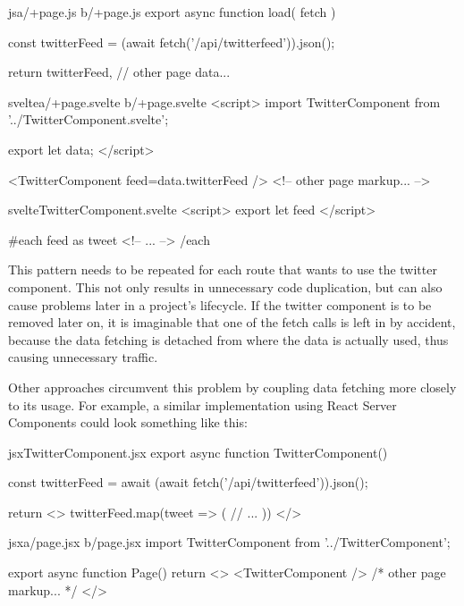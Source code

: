 \begin{listing}[h!]
\begin{myminted}{js}{a/+page.js b/+page.js}
export async function load({ fetch }) {

    const twitterFeed = (await fetch('/api/twitterfeed')).json();

    return {
        twitterFeed,
        // other page data...
    }
}

\end{myminted}
\begin{myminted}{svelte}{a/+page.svelte b/+page.svelte}
<script>
    import TwitterComponent from '../TwitterComponent.svelte';

    export let data;
</script>

<TwitterComponent feed={data.twitterFeed} />
<!-- other page markup... -->
\end{myminted}
\begin{myminted}{svelte}{TwitterComponent.svelte}
<script>
    export let feed
</script>

{#each feed as tweet}
    <!-- ... -->
{/each}
\end{myminted}
\caption{Example Implementation of a reusable component in SvelteKit}
\label{fig:evaluation-reusable-sveltekit}
\end{listing}

This pattern needs to be repeated for each route that wants to use the twitter component. This not only results in unnecessary code duplication, but can also cause problems later in a project's lifecycle. If the twitter component is to be removed later on, it is imaginable that one of the fetch calls is left in by accident, because the data fetching is detached from where the data is actually used, thus causing unnecessary traffic.

Other approaches circumvent this problem by coupling data fetching more closely to its usage. For example, a similar implementation using React Server Components could look something like this:

\begin{listing}[h!]
\begin{myminted}{jsx}{TwitterComponent.jsx}
export async function TwitterComponent() {
    const twitterFeed = await (await fetch('/api/twitterfeed')).json();

    return <>
        {twitterFeed.map(tweet => (
            // ...
        ))}
    </>
}
\end{myminted}
\begin{myminted}{jsx}{a/page.jsx b/page.jsx}
import TwitterComponent from '../TwitterComponent';

export async function Page() {
    return <>
        <TwitterComponent />
        { /* other page markup... */ }
    </>
}
\end{myminted}
\caption{Example of a reusable component using React server components.}
\label{fig:evaluation-reusable-rsc}
\end{listing}

